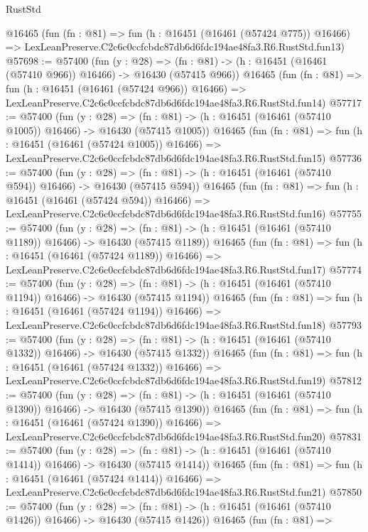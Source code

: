 \begin{lexlean}{RustStd}
\begin{coremodule}
    @16465
    (fun (fn : @81) =>
    fun (h : @16451 (@16461 (@57424 @775)) @16466) =>
    LexLeanPreserve.C2c6c0ccfcbdc87db6d6fdc194ae48fa3.R6.RustStd.fun13)
@57698 := @57400
    (fun (y : @28) =>
    (fn : @81) -> (h : @16451 (@16461 (@57410 @966)) @16466) -> @16430 (@57415 @966))
    @16465
    (fun (fn : @81) =>
    fun (h : @16451 (@16461 (@57424 @966)) @16466) =>
    LexLeanPreserve.C2c6c0ccfcbdc87db6d6fdc194ae48fa3.R6.RustStd.fun14)
@57717 := @57400
    (fun (y : @28) =>
    (fn : @81) -> (h : @16451 (@16461 (@57410 @1005)) @16466) -> @16430 (@57415 @1005))
    @16465
    (fun (fn : @81) =>
    fun (h : @16451 (@16461 (@57424 @1005)) @16466) =>
    LexLeanPreserve.C2c6c0ccfcbdc87db6d6fdc194ae48fa3.R6.RustStd.fun15)
@57736 := @57400
    (fun (y : @28) =>
    (fn : @81) -> (h : @16451 (@16461 (@57410 @594)) @16466) -> @16430 (@57415 @594))
    @16465
    (fun (fn : @81) =>
    fun (h : @16451 (@16461 (@57424 @594)) @16466) =>
    LexLeanPreserve.C2c6c0ccfcbdc87db6d6fdc194ae48fa3.R6.RustStd.fun16)
@57755 := @57400
    (fun (y : @28) =>
    (fn : @81) -> (h : @16451 (@16461 (@57410 @1189)) @16466) -> @16430 (@57415 @1189))
    @16465
    (fun (fn : @81) =>
    fun (h : @16451 (@16461 (@57424 @1189)) @16466) =>
    LexLeanPreserve.C2c6c0ccfcbdc87db6d6fdc194ae48fa3.R6.RustStd.fun17)
@57774 := @57400
    (fun (y : @28) =>
    (fn : @81) -> (h : @16451 (@16461 (@57410 @1194)) @16466) -> @16430 (@57415 @1194))
    @16465
    (fun (fn : @81) =>
    fun (h : @16451 (@16461 (@57424 @1194)) @16466) =>
    LexLeanPreserve.C2c6c0ccfcbdc87db6d6fdc194ae48fa3.R6.RustStd.fun18)
@57793 := @57400
    (fun (y : @28) =>
    (fn : @81) -> (h : @16451 (@16461 (@57410 @1332)) @16466) -> @16430 (@57415 @1332))
    @16465
    (fun (fn : @81) =>
    fun (h : @16451 (@16461 (@57424 @1332)) @16466) =>
    LexLeanPreserve.C2c6c0ccfcbdc87db6d6fdc194ae48fa3.R6.RustStd.fun19)
@57812 := @57400
    (fun (y : @28) =>
    (fn : @81) -> (h : @16451 (@16461 (@57410 @1390)) @16466) -> @16430 (@57415 @1390))
    @16465
    (fun (fn : @81) =>
    fun (h : @16451 (@16461 (@57424 @1390)) @16466) =>
    LexLeanPreserve.C2c6c0ccfcbdc87db6d6fdc194ae48fa3.R6.RustStd.fun20)
@57831 := @57400
    (fun (y : @28) =>
    (fn : @81) -> (h : @16451 (@16461 (@57410 @1414)) @16466) -> @16430 (@57415 @1414))
    @16465
    (fun (fn : @81) =>
    fun (h : @16451 (@16461 (@57424 @1414)) @16466) =>
    LexLeanPreserve.C2c6c0ccfcbdc87db6d6fdc194ae48fa3.R6.RustStd.fun21)
@57850 := @57400
    (fun (y : @28) =>
    (fn : @81) -> (h : @16451 (@16461 (@57410 @1426)) @16466) -> @16430 (@57415 @1426))
    @16465
    (fun (fn : @81) =>

\end{coremodule}
\end{lexlean}
